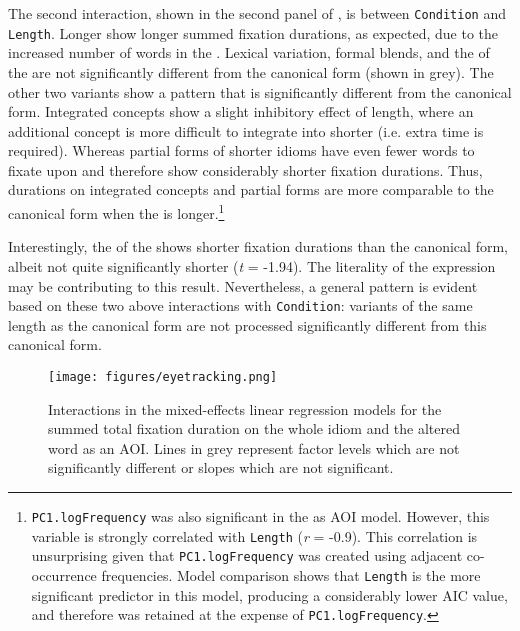\documentclass[output=paper
,modfonts
,nonflat]{langsci/langscibook}
\begin{document}
The second interaction, shown in the second panel of , is between \texttt{Condition} and \texttt{Length}. Longer  show longer summed fixation durations, as expected, due to the increased number of words in the . Lexical  variation, formal   blends, and the  of the  are not significantly different from the canonical form (shown in grey). The other two variants  show a pattern that is significantly different from the canonical form. Integrated concepts show a slight inhibitory effect of length, where an additional concept is more difficult to integrate into shorter  (i.e. extra time is required). Whereas partial forms of shorter idioms have even fewer words to fixate upon and therefore show considerably shorter fixation durations. Thus, durations on integrated concepts  and partial forms  are more comparable to the canonical form when the  is longer.\footnote{\texttt{PC1.logFrequency} was also significant in the  as AOI model. However, this variable is strongly correlated with \texttt{Length} (\textit{r} = -0.9). This correlation is unsurprising given that \texttt{PC1.logFrequency} was created using adjacent co-occurrence frequencies. Model comparison shows that \texttt{Length} is the more significant predictor in this model, producing a considerably lower AIC value, and therefore was retained at the expense of \texttt{PC1.logFrequency}.} 

Interestingly, the  of the  shows shorter fixation durations than the canonical form, albeit not quite significantly shorter (\textit{t} = -1.94). The literality of the expression \citep{TitoneConnine1994b} may be contributing to this result. Nevertheless, a general pattern is evident based on these two above interactions with \texttt{Condition}: variants of the same length as the canonical form are not processed significantly different from this canonical form.


\begin{figure}
\centering
\texttt{[image: figures/eyetracking.png]}
\caption{Interactions in the mixed-effects linear regression models for the summed total fixation duration on the whole idiom and the altered word as an AOI. Lines in grey represent factor levels which are not significantly different or slopes which are not significant.}
\label{plotEyetracking}
\end{figure}
\end{document}
